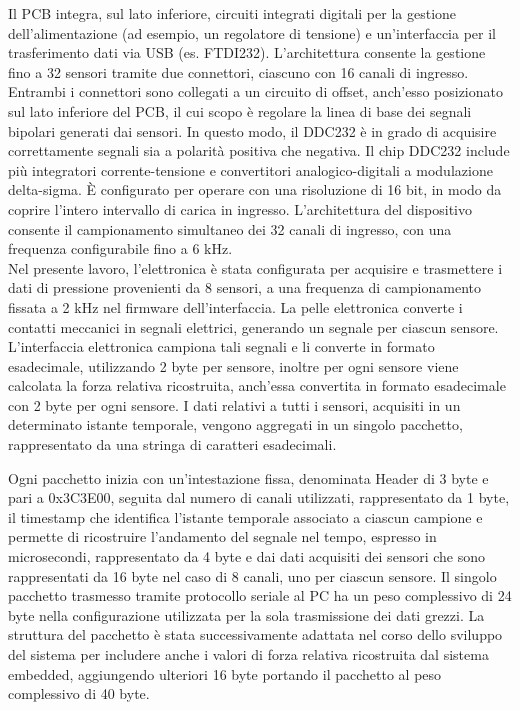 \documentclass[10pt, a4paper]{article}
\begin{document}
            Il PCB integra, sul lato inferiore, circuiti integrati digitali per la gestione dell'alimentazione (ad
            esempio, un regolatore di tensione) e un'interfaccia per il trasferimento dati via USB (es. FTDI232).
            L'architettura consente la gestione fino a 32 sensori tramite due connettori, ciascuno con 16 canali di
            ingresso. Entrambi i connettori sono collegati a un circuito di offset, anch'esso posizionato sul lato
            inferiore del PCB, il cui scopo è regolare la linea di base dei segnali bipolari generati dai sensori. In
            questo modo, il DDC232 è in grado di acquisire correttamente segnali sia a polarità positiva che negativa.
            Il chip DDC232 include più integratori corrente-tensione e convertitori analogico-digitali a modulazione delta-sigma. È configurato per operare con una risoluzione di 16 bit, in 
            modo da coprire l'intero
            intervallo di carica in ingresso. L'architettura del dispositivo consente il campionamento simultaneo dei
            32 canali di ingresso, con una frequenza configurabile fino a 6 kHz.\\
            Nel presente lavoro, l'elettronica è stata configurata per acquisire e trasmettere i dati di pressione provenienti
            da 8 sensori, a una frequenza di campionamento fissata a 2 kHz nel firmware dell'interfaccia.
            La pelle elettronica converte i contatti meccanici in segnali elettrici, generando un segnale per ciascun
            sensore. L'interfaccia elettronica campiona tali segnali e li converte in formato esadecimale, utilizzando 2
            byte per sensore, inoltre per ogni sensore viene calcolata la forza relativa ricostruita, anch'essa convertita in formato esadecimale con 2 byte per ogni sensore. 
            I dati relativi a tutti i sensori, acquisiti in un determinato istante temporale, vengono
            aggregati in un singolo pacchetto, rappresentato da una stringa di caratteri esadecimali.

            Ogni pacchetto inizia con un'intestazione fissa, denominata Header di 3 byte e pari a 0x3C3E00, seguita dal numero di canali utilizzati, rappresentato da 1 byte, il timestamp 
            che identifica l'istante temporale associato a ciascun campione e permette di ricostruire l'andamento del segnale nel tempo,
            espresso in microsecondi, rappresentato da 4 byte e dai dati acquisiti dei sensori che sono rappresentati da 16 byte nel caso di 8 canali, uno per ciascun sensore.
            Il singolo pacchetto trasmesso 
            tramite protocollo seriale al PC ha 
            un peso complessivo di 24 byte nella configurazione utilizzata per la sola trasmissione dei dati grezzi. 
            La struttura del pacchetto è stata successivamente adattata nel corso dello sviluppo del sistema per includere anche i valori di forza relativa ricostruita dal sistema embedded, aggiungendo
            ulteriori 16 byte portando il pacchetto al peso complessivo di 40 byte.
\end{document}
